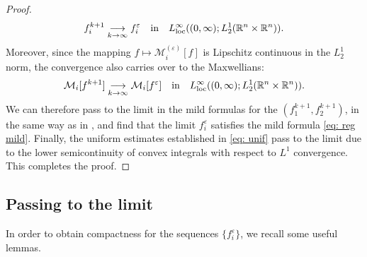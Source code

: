 \documentclass[10pt,reqno]{amsart}
\numberwithin{equation}{section}
\newcommand{\R}{\mathbb R}
\newcommand{\calM}{\mathcal M}
\newcommand{\ve}{\varepsilon}
\begin{document}
\begin{proof}
\begin{align*}
    f_i^{k+1} \underset{k\to\infty}{\longrightarrow} f_i^\ve \quad \text{in}\quad L^\infty_{\rm loc}((0,\infty);L^1_2(\R^n \times \R^n)).
\end{align*}
Moreover, since the mapping $f \mapsto \calM_i^{(\ve)}[f]$ is Lipschitz continuous in the $L^1_2$ norm, the convergence also carries over to the Maxwellians:
\begin{align*}
    \calM_i[f^{k+1}] \underset{k\to\infty}{\longrightarrow} \calM_i[f^\ve] \quad \text{in}\quad L^\infty_{\rm loc} ((0,\infty);L^1_2(\R^n \times \R^n)).
\end{align*}
 We can therefore pass to the limit in the mild formulas for the $(f_1^{k+1},f_2^{k+1})$, in the same way as in \cite[Proposition 3.1]{KS24}, and find that the limit $f_i^\ve$ satisfies the mild formula \eqref{eq: reg mild}. Finally, the uniform estimates established in \eqref{eq: unif} pass to the limit due to the lower semicontinuity of convex integrals with respect to $L^1$ convergence. This completes the proof.
\end{proof}
%
%
%
%
%
%
%
%
%
%
%
%
%
\subsection{Passing to the limit}

In order to obtain compactness for the sequences $\{f_i^\ve\}$, we recall some useful lemmas.
\end{document}
